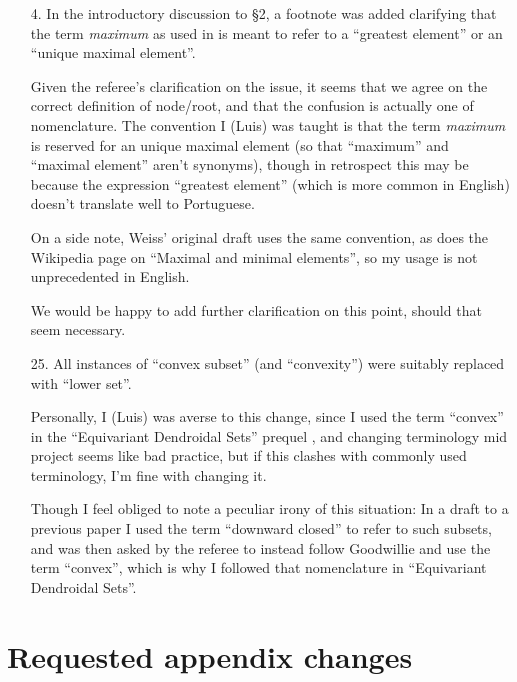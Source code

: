 \documentclass{article}
\begin{document}
\begin{itemize}
	\item[4.] In the introductory discussion to \S 2,
	a footnote was added clarifying that the term 
	\emph{maximum} as used in \cite{Per18}
	is meant to refer to a ``greatest element'' or 
	an ``unique maximal element''.
	
	Given the referee's clarification on the issue, 
	it seems that we agree on the correct definition of node/root,
	and that the confusion is actually one of nomenclature.
	The convention I (Luis) was taught is that the term \emph{maximum}
	is reserved for an unique maximal element
	(so that ``maximum'' and ``maximal element'' aren't synonyms),
	though in retrospect this may be because the expression 
	``greatest element'' (which is more common in English) doesn't translate well to Portuguese.
	
	On a side note, Weiss' original draft \cite{Wei12}
	uses the same convention, 
	as does the Wikipedia page on ``Maximal and minimal elements'',
	so my usage is not unprecedented in English.
	
	We would be happy to add further clarification
	on this point, should that seem necessary.
		
	\item[25.] All instances of ``convex subset'' (and ``convexity'') were suitably replaced with ``lower set''.
	
	Personally, I (Luis) was averse to this change,
	since I used the term ``convex'' in the
	``Equivariant Dendroidal Sets'' prequel \cite{Per18},
	and changing terminology mid project seems like bad practice,
	but if this clashes with commonly used terminology, I'm fine with changing it.
	
	Though I feel obliged to note a peculiar irony of this situation:
	In a draft to a previous paper I used the term
	``downward closed'' to refer to such subsets,
	and was then asked by the referee to 
	instead follow Goodwillie and use the term ``convex'',
	which is why I followed that nomenclature in 
	``Equivariant Dendroidal Sets''.
\end{itemize}





\section{Requested appendix changes}
\end{document}
